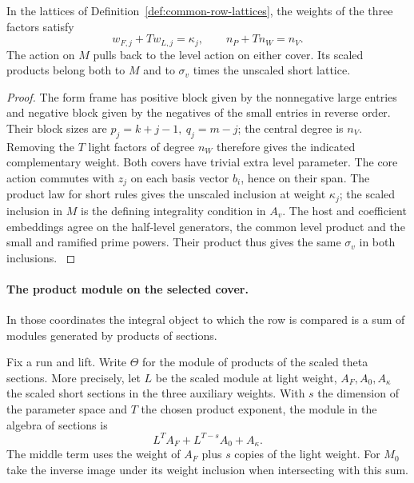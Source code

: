 \begin{lemma}\label{lem:selected-form-level-tie}
In the lattices of Definition~\ref{def:common-row-lattices}, the weights of the three factors satisfy
\[
 w_{F,j}+Tw_{L,j}=\kappa_j,\qquad n_P+Tn_W=n_V .
\]
The action on \(M\) pulls back to the level action on either cover.
Its scaled products belong both to \(M\) and to \(\sigma_v\) times
the unscaled short lattice.
\end{lemma}
\begin{proof}
The form frame has positive block given by the nonnegative large
entries and negative block given by the negatives of the small entries
in reverse order. Their block sizes are \(p_j=k+j-1,\ q_j=m-j\);
the central degree is \(n_V\). Removing the \(T\) light factors of
degree \(n_W\) therefore gives the indicated complementary weight.
Both covers have trivial extra level parameter. The core action
commutes with \(z_j\) on each basis vector \(b_i\), hence on their span.
The product law for short rules gives the unscaled inclusion at
weight \(\kappa_j\); the scaled inclusion in \(M\) is the defining
integrality condition in \(A_v\). The host and coefficient embeddings
agree on the half-level generators, the common level product and the
small and ramified prime powers. Their product thus gives the same
\(\sigma_v\) in both inclusions. \label{cor:paired-row-indices-1}
\end{proof}

\paragraph{The product module on the selected cover.}

In those coordinates the integral object to which the row is compared is a sum of modules generated by products of sections.

Fix a run and lift. Write \(\Theta\) for the module of
products of the scaled theta sections. More
precisely, let \(L\) be the scaled module at light weight,
\(A_F,A_0,A_\kappa\) the scaled short sections in the three
auxiliary weights. With \(s\) the dimension of the parameter
space and \(T\) the chosen product exponent, the module in the
algebra of sections is
\[
                L^T A_F+ L^{T-s} A_0+A_\kappa .
\]
The middle term uses the weight of \(A_F\) plus \(s\) copies of
the light weight. For \(M_0\) take the inverse image under its
weight inclusion when intersecting with this sum. 

